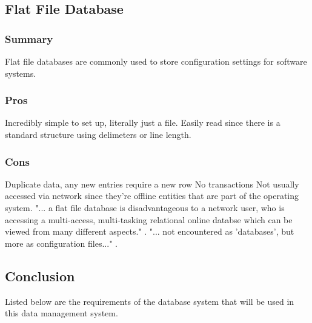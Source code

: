 \documentclass[draftclsnofoot,onecolumn,letterpaper,10pt,compsoc]{IEEEtran}
\begin{document}
			\subsection{Flat File Database}
		        \subsubsection{Summary}
		            Flat file databases are commonly used to store configuration settings for software systems.

		        \subsubsection{Pros}
		            Incredibly simple to set up, literally just a file.
		            Easily read since there is a standard structure using delimeters or line length.

		        \subsubsection{Cons}
		            Duplicate data, any new entries require a new row
		            No transactions
		            Not usually accessed via network since they're offline entities that are part of the operating system\cite{Techwalla}.
		            "... a flat file database is disadvantageous to a network user, who is accessing a multi-access, multi-tasking relational online databse which can be viewed from many different aspects." \cite{Techwalla}.
		            "... not encountered as 'databases', but more as configuration files..." \cite{Techwalla}.

		    \subsection{Conclusion}
		        Listed below are the requirements of the database system that will be used in this data management system.
\end{document}
